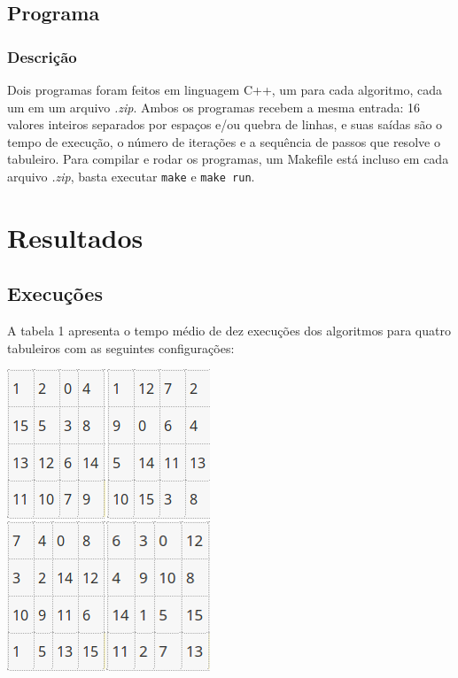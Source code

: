 \documentclass[12pt,a4paper]{article}
\begin{document}
\subsection{Programa}
\subsubsection{Descrição}
    \par Dois programas foram feitos em linguagem C++, um para cada algoritmo, cada um em um arquivo {\it .zip}. Ambos os programas recebem a mesma entrada: 16 valores inteiros separados por espaços e/ou quebra de linhas, e suas saídas são o tempo de execução, o número de iterações e a sequência de passos que resolve o tabuleiro.
    Para compilar e rodar os programas, um Makefile está incluso em cada arquivo {\it .zip}, basta executar \verb|make| e \verb|make run|.

\newpage
\section{Resultados}

\subsection{Execuções}
    \par A tabela 1 apresenta o tempo médio de dez execuções dos algoritmos para quatro tabuleiros com as seguintes configurações:

\begin{center}
    \includegraphics{test-puzzles.png}
\end{center}
\end{document}
